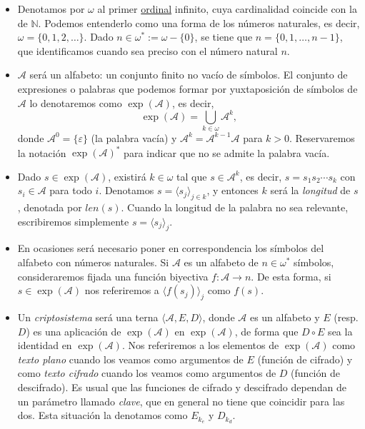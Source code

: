 \documentclass[
  a4paper,
  spanish,
  12pt,
]{scrartcl}
\theoremstyle{ejercicio-style}
\theoremstyle{remark-style}
\theoremstyle{teorema-style}
\begin{document}
\begin{itemize}
\item Denotamos por $\omega$ al primer \href{https://en.wikipedia.org/wiki/Ordinal_number}{ordinal} infinito, cuya cardinalidad coincide con la de $\mathbb{N}$. Podemos entenderlo como una forma de  los números naturales, es decir, $\omega = \{0,1,2, \dots \}$. Dado $n \in \omega^\ast := \omega - \{0\}$, se tiene que $n = \{0, 1, \dots, n-1\}$, que identificamos cuando sea preciso con el número natural $n$.
\item $\mathcal{A}$ será un alfabeto: un conjunto finito no vacío de símbolos. El conjunto de expresiones o palabras que podemos formar por yuxtaposición de símbolos de $\mathcal{A}$ lo denotaremos como $\exp(\mathcal{A})$, es decir, \[ \exp(\mathcal{A}) = \bigcup_{k \in \omega} \mathcal{A}^k,\] donde $\mathcal{A}^0 = \{\varepsilon\}$ (la palabra vacía) y $\mathcal{A}^k = \mathcal{A}^{k-1}\mathcal{A}$ para $k > 0$. Reservaremos la notación $\exp(\mathcal{A})^\ast$ para indicar que no se admite la palabra vacía.
\item Dado $s \in \exp(\mathcal{A})$, existirá $k \in \omega$ tal que $s \in \mathcal{A}^k$, es decir, $s = s_1s_2\cdots s_k$ con $s_i \in \mathcal{A}$ para todo $i$. Denotamos $s = \langle s_j \rangle_{j \in k}$, y entonces $k$ será la \textit{longitud} de $s$, denotada por $len(s)$. Cuando la longitud de la palabra no sea relevante, escribiremos simplemente $s = \langle s_j \rangle_{j}$.
\item En ocasiones será necesario poner en correspondencia los símbolos del alfabeto con números naturales. Si $\mathcal{A}$ es un alfabeto de $n \in \omega^\ast$ símbolos, consideraremos fijada una función biyectiva $f: \mathcal{A} \to n$. De esta forma, si $s \in \exp(\mathcal{A})$ nos referiremos a $\langle f(s_j) \rangle_j$ como $f(s)$.
\item Un \textit{criptosistema} será una terna $\langle \mathcal{A}, E, D \rangle$, donde $\mathcal{A}$ es un alfabeto y $E$ (resp. $D$) es una aplicación de $\exp(\mathcal{A})$ en $\exp(\mathcal{A})$, de forma que $D \circ E$ sea la identidad en $\exp(\mathcal{A})$. Nos referiremos a los elementos de $\exp(\mathcal{A})$ como \textit{texto plano} cuando los veamos como argumentos de $E$ (función de cifrado) y como \textit{texto cifrado} cuando los veamos como argumentos de $D$ (función de descifrado). Es usual que las funciones de cifrado y descifrado dependan de un parámetro llamado \textit{clave}, que en general no tiene que coincidir para las dos. Esta situación la denotamos como $E_{k_e}$ y $D_{k_d}$.
\end{itemize}
\end{document}
